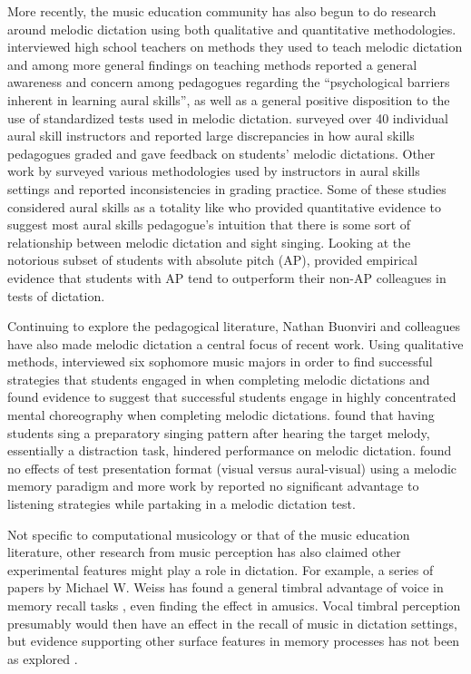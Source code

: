 \documentclass[12pt,]{book}
\begin{document}
More recently, the music education community has also begun to do research around melodic dictation using both qualitative and quantitative methodologies.
\citet{paneyTeachingMelodicDictation2014} interviewed high school teachers on methods they used to teach melodic dictation and among more general findings on teaching methods reported a general awareness and concern among pedagogues regarding the ``psychological barriers inherent in learning aural skills'', as well as a general positive disposition to the use of standardized tests used in melodic dictation.
\citet{gillespieMelodicDictationScoring2001} surveyed over 40 individual aural skill instructors and reported large discrepancies in how aural skills pedagogues graded and gave feedback on students' melodic dictations.
Other work by \citet{pembrookSendHelpAural1990} surveyed various methodologies used by instructors in aural skills settings and reported inconsistencies in grading practice.
Some of these studies considered aural skills as a totality like \citet{norrisRelationshipSightSinging2003} who provided quantitative evidence to suggest most aural skills pedagogue's intuition that there is some sort of relationship between melodic dictation and sight singing.
Looking at the notorious subset of students with absolute pitch (AP), \citet{dooleyAbsolutePitchCorrelates2010} provided empirical evidence that students with AP tend to outperform their non-AP colleagues in tests of dictation.

Continuing to explore the pedagogical literature, Nathan Buonviri and colleagues have also made melodic dictation a central focus of recent work.
Using qualitative methods, \citet{buonviriEffectsMusicNotation2015} interviewed six sophomore music majors in order to find successful strategies that students engaged in when completing melodic dictations and found evidence to suggest that successful students engage in highly concentrated mental choreography when completing melodic dictations.
\citet{buonviriMelodicDictationInstruction2015} found that having students sing a preparatory singing pattern after hearing the target melody, essentially a distraction task, hindered performance on melodic dictation.
\citet{buonviriEffectsMusicNotation2015} found no effects of test presentation format (visual versus aural-visual) using a melodic memory paradigm and more work by \citet{buonviriEffectsTwoListening2017} reported no significant advantage to listening strategies while partaking in a melodic dictation test.

Not specific to computational musicology or that of the music education literature, other research from music perception has also claimed other experimental features might play a role in dictation.
For example, a series of papers by Michael W. Weiss has found a general timbral advantage of voice in memory recall tasks \citep{weissRapidCommunicationPianists2015, weissAbilityProcessMusical2019}, even finding the effect in amusics.
Vocal timbral perception presumably would then have an effect in the recall of music in dictation settings, but evidence supporting other surface features in memory processes has not been as explored \citep{schellenbergMemorySurfaceFeatures2014}.
\end{document}
